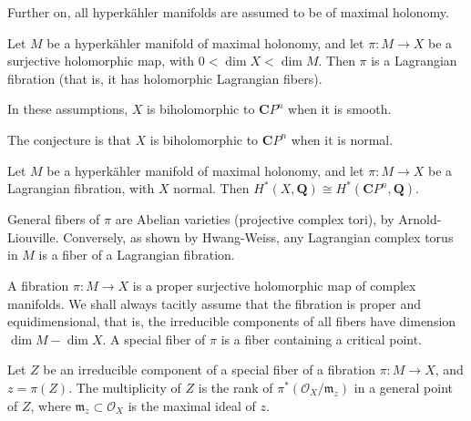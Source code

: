 \medskip\noindent
Further on, all hyperk\"ahler manifolds are
assumed to be of maximal holonomy.

\begin{theorem}[Matsushita]
\label{theorem-matsushita-lagrangian}
Let \(M\) be a hyperk\"ahler manifold of
maximal holonomy, and let
\(\pi : M \to X\) be a surjective
holomorphic map, with \(0 < \dim X < \dim M\).
Then \(\pi\) is a Lagrangian fibration
(that is, it has holomorphic Lagrangian
fibers).
\end{theorem}

\begin{theorem}[Hwang]
\label{theorem-hwang-smooth-base}
In these assumptions, \(X\) is biholomorphic
to \(\mathbf{C}P^n\) when it is smooth.
\end{theorem}

\medskip\noindent
The conjecture is that \(X\) is biholomorphic
to \(\mathbf{C}P^n\) when it is normal.

\begin{theorem}[Matsushita]
\label{theorem-matsushita-normal-base}
Let \(M\) be a hyperk\"ahler manifold of
maximal holonomy, and let
\(\pi : M \to X\) be a Lagrangian fibration,
with \(X\) normal. Then
\(H^*(X,\mathbf{Q}) \cong H^*(\mathbf{C}P^n,
\mathbf{Q})\).
\end{theorem}

\begin{remark}
\label{remark-general-fibers-abelian}
General fibers of \(\pi\) are Abelian
varieties (projective complex tori), by
Arnold-Liouville. Conversely, as shown by
Hwang-Weiss, any Lagrangian complex torus in
\(M\) is a fiber of a Lagrangian fibration.
\end{remark}

\begin{remark}
\label{remark-fibration}
A fibration \(\pi : M \to X\) is a proper
surjective holomorphic map of complex
manifolds. We shall always tacitly assume
that the fibration is proper and
equidimensional, that is, the irreducible
components of all fibers have dimension
\(\dim M - \dim X\). A special fiber of
\(\pi\) is a fiber containing a critical
point.
\end{remark}

\begin{definition}
\label{definition-multiplicity-special-fiber}
Let \(Z\) be an irreducible component of a
special fiber of a fibration
\(\pi : M \to X\), and \(z=\pi(Z)\). The
multiplicity of \(Z\) is the rank of
\(\pi^*(\mathcal{O}_X/\mathfrak{m}_z)\) in a
general point of \(Z\), where
\(\mathfrak{m}_z \subset \mathcal{O}_X\) is
the maximal ideal of \(z\).
\end{definition}

